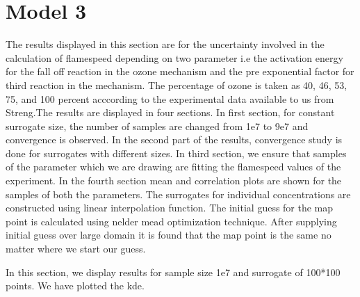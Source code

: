 \section{Model 3}

The results displayed in this section are for the uncertainty involved in the calculation of flamespeed depending  on two parameter i.e the activation energy for the fall off reaction in the ozone mechanism and the pre exponential factor for third reaction in the mechanism. The percentage of ozone is taken as 40, 46, 53, 75, and 100  percent acccording to the experimental data available to us from Streng\cite{Streng}.The results are displayed in four sections. In first section, for constant surrogate size, the number of samples are changed from 1e7 to 9e7 and convergence is observed. In the second part of the results, convergence study is done for surrogates with different sizes. In third section, we ensure that samples of the parameter which we are drawing are fitting the flamespeed values of the experiment. In the fourth section mean and correlation plots are shown for the samples of both the parameters. The surrogates for individual concentrations are constructed using linear interpolation function. The initial guess for the map point is calculated using nelder mead optimization technique. After supplying initial guess over large domain it is found that the map point is the same no matter where we start our guess. 


 In this section, we display results for sample size 1e7 and surrogate of 100*100 points. We  have plotted the kde. 

